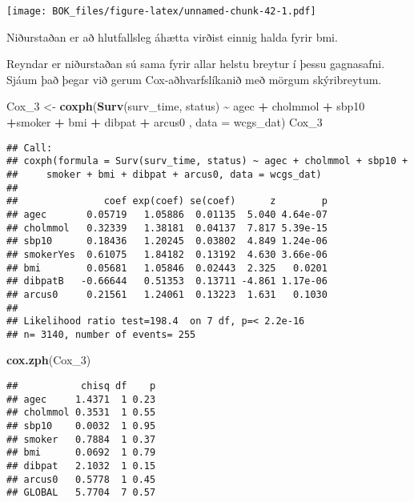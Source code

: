 \documentclass[
]{book}
\newenvironment{Shaded}{\begin{snugshade}}{\end{snugshade}}
\newcommand{\DataTypeTok}[1]{\textcolor[rgb]{0.13,0.29,0.53}{#1}}
\newcommand{\DecValTok}[1]{\textcolor[rgb]{0.00,0.00,0.81}{#1}}
\newcommand{\KeywordTok}[1]{\textcolor[rgb]{0.13,0.29,0.53}{\textbf{#1}}}
\newcommand{\NormalTok}[1]{#1}
\newcommand{\OperatorTok}[1]{\textcolor[rgb]{0.81,0.36,0.00}{\textbf{#1}}}
\newcommand{\StringTok}[1]{\textcolor[rgb]{0.31,0.60,0.02}{#1}}
\begin{document}
\texttt{[image: BOK\_files/figure-latex/unnamed-chunk-42-1.pdf]}

Niðurstaðan er að hlutfallsleg áhætta virðist einnig halda fyrir bmi.

Reyndar er niðurstaðan sú sama fyrir allar helstu breytur í þessu gagnasafni. Sjáum það þegar við gerum Cox-aðhvarfslíkanið með mörgum skýribreytum.

\begin{Shaded}
\begin{Highlighting}[]
\NormalTok{Cox\_}\DecValTok{3}\NormalTok{ <{-}}\StringTok{ }\KeywordTok{coxph}\NormalTok{(}\KeywordTok{Surv}\NormalTok{(surv\_time, status) }\OperatorTok{\textasciitilde{}}\StringTok{  }\NormalTok{agec }\OperatorTok{+}\StringTok{ }\NormalTok{cholmmol }\OperatorTok{+}\StringTok{ }\NormalTok{sbp10 }\OperatorTok{+}\NormalTok{smoker }\OperatorTok{+}\StringTok{ }\NormalTok{bmi  }\OperatorTok{+}\StringTok{ }\NormalTok{dibpat }\OperatorTok{+}\StringTok{ }\NormalTok{arcus0  , }\DataTypeTok{data =}\NormalTok{ wcgs\_dat)}
\NormalTok{Cox\_}\DecValTok{3}
\end{Highlighting}
\end{Shaded}

\begin{verbatim}
## Call:
## coxph(formula = Surv(surv_time, status) ~ agec + cholmmol + sbp10 + 
##     smoker + bmi + dibpat + arcus0, data = wcgs_dat)
## 
##               coef exp(coef) se(coef)      z        p
## agec       0.05719   1.05886  0.01135  5.040 4.64e-07
## cholmmol   0.32339   1.38181  0.04137  7.817 5.39e-15
## sbp10      0.18436   1.20245  0.03802  4.849 1.24e-06
## smokerYes  0.61075   1.84182  0.13192  4.630 3.66e-06
## bmi        0.05681   1.05846  0.02443  2.325   0.0201
## dibpatB   -0.66644   0.51353  0.13711 -4.861 1.17e-06
## arcus0     0.21561   1.24061  0.13223  1.631   0.1030
## 
## Likelihood ratio test=198.4  on 7 df, p=< 2.2e-16
## n= 3140, number of events= 255
\end{verbatim}

\begin{Shaded}
\begin{Highlighting}[]
\KeywordTok{cox.zph}\NormalTok{(Cox\_}\DecValTok{3}\NormalTok{)}
\end{Highlighting}
\end{Shaded}

\begin{verbatim}
##           chisq df    p
## agec     1.4371  1 0.23
## cholmmol 0.3531  1 0.55
## sbp10    0.0032  1 0.95
## smoker   0.7884  1 0.37
## bmi      0.0692  1 0.79
## dibpat   2.1032  1 0.15
## arcus0   0.5778  1 0.45
## GLOBAL   5.7704  7 0.57
\end{verbatim}
\end{document}
